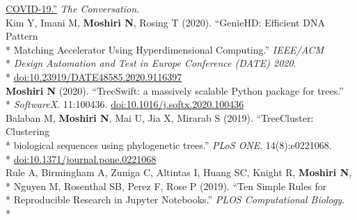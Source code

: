\documentclass[margin,line]{res}
\begin{document}
\begin{resume}
\hspace*{8mm} \href{https://theconversation.com/heres-how-scientists-are-tracking-the-genetic-evolution-of-covid-19-134201}{COVID-19.''} \textit{The Conversation}.\\
\hspace*{4mm} Kim Y, Imani M, \textbf{Moshiri N}, Rosing T (2020). ``GenieHD: Efficient DNA Pattern\\*
\hspace*{9mm}  Matching Accelerator Using Hyperdimensional Computing.'' \textit{IEEE/ACM}\\*
\hspace*{9mm} \textit{Design Automation and Test in Europe Conference (DATE) 2020}.\\*\vspace{2mm}
\hspace*{8mm} \href{https://doi.org/10.23919/DATE48585.2020.9116397}{doi:10.23919/DATE48585.2020.9116397}\\
\hspace*{4mm} \textbf{Moshiri N} (2020). ``TreeSwift: a massively scalable Python package for trees.''\\*\vspace{2mm}
\hspace*{8mm} \textit{SoftwareX}. 11:100436. \href{https://doi.org/10.1016/j.softx.2020.100436}{doi:10.1016/j.softx.2020.100436}\\
\hspace*{4mm} Balaban M, \textbf{Moshiri N}, Mai U, Jia X, Mirarab S (2019). ``TreeCluster: Clustering\\*
\hspace*{9mm} biological sequences using phylogenetic trees.'' \textit{PLoS ONE}. 14(8):e0221068.\\*\vspace{2mm}
\hspace*{8mm} \href{https://doi.org/10.1371/journal.pone.0221068}{doi:10.1371/journal.pone.0221068}\\
\hspace*{4mm} Rule A, Birmingham A, Zuniga C, Altintas I, Huang SC, Knight R, \textbf{Moshiri N},\\*
\hspace*{9mm} Nguyen M, Rosenthal SB, Perez F, Rose P (2019). ``Ten Simple Rules for\\*
\hspace*{9mm} Reproducible Research in Jupyter Notebooks.'' \textit{PLOS Computational Biology}.\\*\vspace{2mm}

\end{resume}
\end{document}
